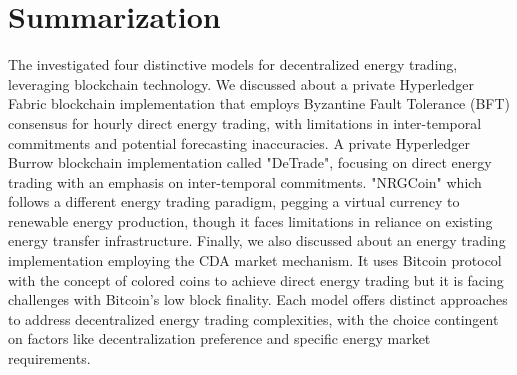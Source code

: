 \section{Summarization}
The investigated four distinctive models for decentralized energy trading, leveraging blockchain technology. We discussed about a private Hyperledger Fabric blockchain implementation that employs Byzantine Fault Tolerance (BFT) 
consensus for hourly direct energy trading, with limitations in inter-temporal commitments and potential forecasting inaccuracies. A private Hyperledger Burrow blockchain implementation called "DeTrade", focusing on direct energy 
trading with an emphasis on inter-temporal commitments. "NRGCoin" which follows a different energy trading paradigm, pegging a virtual currency to renewable energy production, though it faces limitations in reliance on existing 
energy transfer infrastructure. Finally, we also discussed about an energy trading implementation employing the CDA market mechanism. It uses Bitcoin protocol with the concept of colored coins to achieve direct energy trading but 
it is facing challenges with Bitcoin's low block finality. Each model offers distinct approaches to address decentralized energy trading complexities, with the choice contingent on factors like decentralization preference and 
specific energy market requirements.